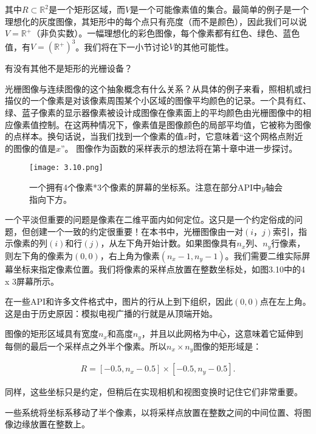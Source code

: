 \documentclass[lang=cn,12pt]{elegantbook}
\begin{document}
其中$R\subset \mathbb{R} ^2$是一个矩形区域，而$V$是一个可能像素值的集合。最简单的例子是一个理想化的灰度图像，其矩形中的每个点只有亮度（而不是颜色），因此我们可以说$V=\mathbb{R}^{+}$（非负实数）。一幅理想化的彩色图像，每个像素都有红色、绿色、蓝色值，有$V=(\mathbb{R}^{+})^3$。我们将在下一小节讨论$V$的其他可能性。

\begin{note}
有没有其他不是矩形的光栅设备？
\end{note}

光栅图像与连续图像的这个抽象概念有什么关系？从具体的例子来看，照相机或扫描仪的一个像素是对该像素周围某个小区域的图像平均颜色的记录。一个具有红、绿、蓝子像素的显示器像素被设计成图像在像素面上的平均颜色由光栅图像中的相应像素值控制。在这两种情况下，像素值是图像颜色的局部平均值，它被称为图像的点样本。换句话说，当我们找到一个像素的值$x$时，它意味着“这个网格点附近的图像的值是$x$”。 图像作为函数的采样表示的想法将在第十章中进一步探讨。

\begin{figure}[htb]
  \centering
  \texttt{[image: 3.10.png]}
  \caption{一个拥有4个像素*3个像素的屏幕的坐标系。注意在部分API中$y$轴会指向下方。}
\end{figure}

一个平淡但重要的问题是像素在二维平面内如何定位。这只是一个约定俗成的问题，但创建一个一致的约定很重要！在本书中，光栅图像由一对$(i，j)$索引，指示像素的列$(i)$和行$(j)$，从左下角开始计数。如果图像具有$n_x$列、$n_y$行像素，则左下角的像素为$(0,0)$，右上角为像素$(n_x-1,n_y-1)$。我们需要二维实际屏幕坐标来指定像素位置。我们将像素的采样点放置在整数坐标处，如图3.10中的4 x 3屏幕所示。

\begin{note}
在一些API和许多文件格式中，图片的行从上到下组织，因此$(0,0)$点在左上角。这是由于历史原因：模拟电视广播的行就是从顶端开始。
\end{note}

图像的矩形区域具有宽度$n_x$和高度$n_y$，并且以此网格为中心，这意味着它延伸到每侧的最后一个采样点之外半个像素。所以$n_x \times n_y$图像的矩形域是：

\[
  \begin{aligned}
  R=[-0.5,n_x-0.5]\times [-0.5,n_y-0.5].
  \end{aligned}
\]

同样，这些坐标只是约定，但稍后在实现相机和视图变换时记住它们非常重要。

\begin{note}
一些系统将坐标系移动了半个像素，以将采样点放置在整数之间的中间位置、将图像边缘放置在整数上。
\end{note}
\end{document}
